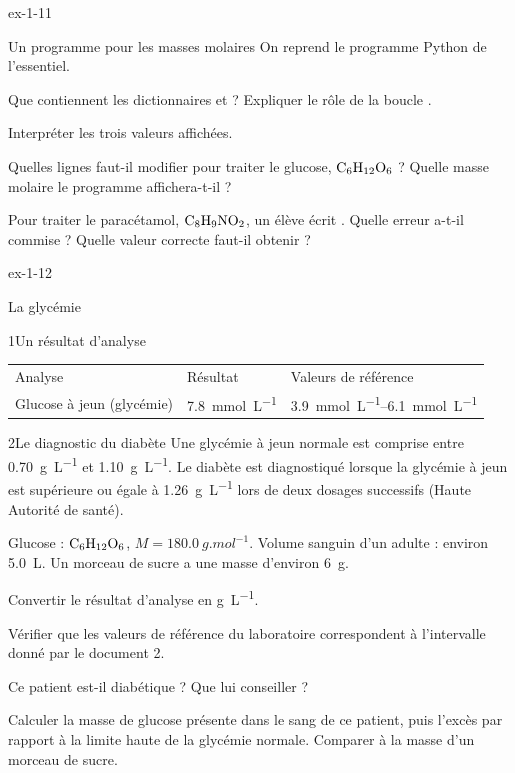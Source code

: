 \begin{blocLivre}{ex-1-11}
\begin{exercice}[2]{Un programme pour les masses molaires}
On reprend le programme Python de l'essentiel.
\begin{questions}
\item {}Que contiennent les dictionnaires  et  ? Expliquer le rôle de la boucle .
\item Interpréter les trois valeurs affichées.
\item Quelles lignes faut-il modifier pour traiter le glucose, $\ce{C6H12O6}$ ? Quelle masse molaire le programme affichera-t-il ?
\item Pour traiter le paracétamol, $\ce{C8H9NO2}$, un élève écrit . Quelle erreur a-t-il commise ?
Quelle valeur correcte faut-il obtenir ?
\end{questions}
\end{exercice}
\end{blocLivre}
\begin{blocLivre}{ex-1-12}
\begin{exercice}[3]{La glycémie}
\begin{docu}{1}{Un résultat d'analyse}
\begin{tabular}{@{}lll@{}}
Analyse & Résultat & Valeurs de référence \\
Glucose à jeun (glycémie) & \qty{7,8}{mmol.L^{-1}} & \qtyrange{3,9}{6,1}{mmol.L^{-1}} \\
\end{tabular}
\end{docu}
\begin{docu}{2}{Le diagnostic du diabète}
Une glycémie à jeun normale est comprise entre \qty{0,70}{g.L^{-1}} et \qty{1,10}{g.L^{-1}}. Le diabète est diagnostiqué lorsque la glycémie
à jeun est supérieure ou égale à \qty{1,26}{g.L^{-1}} lors de deux dosages successifs (Haute Autorité de santé).
\end{docu}
\begin{donnees}
Glucose : $\ce{C6H12O6}$, $M=\qty{180,0}{g.mol^{-1}}$. Volume sanguin d'un adulte : environ \qty{5,0}{L}. Un morceau de sucre a une masse
d'environ \qty{6}{g}.
\end{donnees}
\begin{questions}
\item Convertir le résultat d'analyse en \unit{g.L^{-1}}.
\item Vérifier que les valeurs de référence du laboratoire correspondent à l'intervalle donné par le document 2.
\item \initiative Ce patient est-il diabétique ? Que lui conseiller ?
\item Calculer la masse de glucose présente dans le sang de ce patient, puis l'excès par rapport à la limite haute de la
glycémie normale. Comparer à la masse d'un morceau de sucre.
\end{questions}
\end{exercice}
\end{blocLivre}
